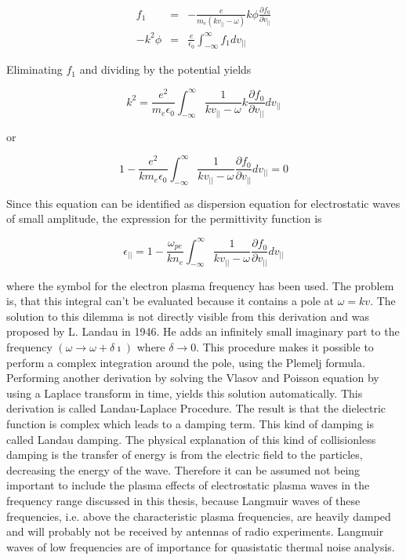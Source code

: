 \documentclass[a4paper,11pt]{thesis}
\begin{document}
\begin{eqnarray}
f_1&=&-\frac{e}{m_e  (k v_{||}-\omega)}k \phi \frac{\partial f_0}{\partial v_{||}}\\
-k^2 \phi&=&\frac{e}{\epsilon_0}\int_{-\infty}^{\infty} f_1 d v_{||}
\end{eqnarray}

Eliminating $f_1$ and dividing by the potential yields

\begin{equation}
k^2 =\frac{e^2}{m_e \epsilon_0}\int_{-\infty}^{\infty} \frac{1}{ k v_{||}-\omega}k  \frac{\partial f_0}{\partial v_{||}} d v_{||}
\end{equation}

or

\begin{equation}
1 -\frac{e^2}{k m_e \epsilon_0}\int_{-\infty}^{\infty} \frac{1}{ k v_{||}-\omega}  \frac{\partial f_0}{\partial v_{||}} d v_{||}=0
\end{equation}

Since this equation can be identified as dispersion equation for electrostatic waves of small amplitude, the expression for the permittivity function is

\begin{equation}\label{eq:permitt_es_waves}
\epsilon_{||}=1 -\frac{\omega_{pe}}{k n_e}\int_{-\infty}^{\infty} \frac{1}{ k v_{||}-\omega}  \frac{\partial f_0}{\partial v_{||}} d v_{||}
\end{equation}

where the symbol for the electron plasma frequency has been used. The problem is, that this integral can't be evaluated because it contains a pole at $\omega=k v$. The solution to this dilemma is not directly visible from this derivation and was proposed by L. Landau in 1946. He adds an infinitely small imaginary part to the frequency $(\omega \rightarrow \omega+\delta \imath)$ where $\delta \rightarrow 0$. This procedure makes it possible to perform a complex integration around the pole, using the Plemelj formula. Performing another derivation by solving the Vlasov and Poisson equation by using a Laplace transform in time, yields this solution automatically. This derivation is called Landau-Laplace Procedure. The result is that the dielectric function is complex which leads to a damping term. This kind of damping is called Landau damping. The physical explanation of this kind of collisionless damping is the transfer of energy is from the electric field to the particles, decreasing the energy of the wave. Therefore it can be assumed not being important to include the plasma effects of electrostatic plasma waves in the frequency range discussed in this thesis, because Langmuir waves of these frequencies, i.e. above the characteristic plasma frequencies, are heavily damped and will probably not be received by antennas of radio experiments. Langmuir waves of low frequencies are of importance for quasistatic thermal noise analysis.\\
\end{document}
